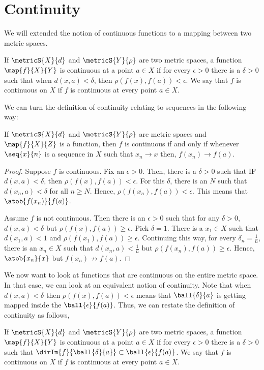 \section{Continuity}
We will extended the notion of continuous functions to a mapping between two metric spaces.
\begin{Definition}[name=Continuous function]
    If $\metricS{X}{d}$ and $\metricS{Y}{\rho}$ are two metric spaces, a function $\map{f}{X}{Y}$ is
    continuous at a point $a \in X$ if for every $\epsilon > 0$ there is a $\delta > 0$ such that when 
    $d(x,a) < \delta$, then $\rho(f(x),f(a)) < \epsilon$. We say that $f$ is continuous on $X$ if $f$ is
    continuous at every point $a \in X$.
\end{Definition}
We can turn the definition of continuity relating to sequences in the following way:
\begin{Proposition}
    If $\metricS{X}{d}$ and $\metricS{Y}{\rho}$ are metric spaces and $\map{f}{X}{Z}$ is a function, then
    $f$ is continuous if and only if whenever $\seq{x}{n}$ is a sequence in $X$ such that $x_n\to x$ then,
    $f(x_n)\to f(a)$.
\end{Proposition}
\begin{proof}
    Suppose $f$ is continuous. Fix an $\epsilon > 0$. Then, there is a $\delta > 0$ such that IF $d(x,a) <
    \delta$, then $\rho(f(x),f(a)) < \epsilon$. For this $\delta$, there is an $N$ such that $d(x_n,a) <
    \delta$ for all $n \geq N$. Hence, $\rho(f(x_n),f(a)) < \epsilon$. This means that $\atob{f(x_n)}{f(a)}$.

    Assume $f$ is not continuous. Then there is an $\epsilon > 0$ such that for any $\delta > 0$,
    $d(x,a) < \delta$ but $\rho(f(x),f(a)) \geq \epsilon$.
    Pick $\delta = 1$. There is a $x_1 \in X$ such that $d(x_1,a) < 1$ and $\rho(f(x_1),f(a)) \geq \epsilon$.
    Continuing this way, for every $\delta_n = \frac{1}{n}$, there is an $x_n \in X$ such that $d(x_n,a) <
    \frac{1}{n}$ but $\rho(f(x_n),f(a)) \geq \epsilon$. Hence, $\atob{x_n}{x}$ but $f(x_n)\not\to f(a)$.
\end{proof}
We now want to look at functions that are continuous on the entire metric space. In that case, we can look at
an equivalent notion of continuity. Note that when $d(x,a) < \delta$ then $\rho(f(x),f(a)) < \epsilon$ 
means that $\ball{\delta}{a}$ is getting mapped inside the $\ball{\epsilon}{f(a)}$. Thus, we can restate the
definition of continuity as follows,
\begin{Proposition}
     If $\metricS{X}{d}$ and $\metricS{Y}{\rho}$ are two metric spaces, a function $\map{f}{X}{Y}$ is 
     continuous at a point $a \in X$ if for every $\epsilon > 0$ there is a $\delta > 0$ such that 
     $\dirIm{f}{\ball{\delta}{a}} \subset \ball{\epsilon}{f(a)}$. We say that $f$ is continuous on $X$ if $f$ is
    continuous at every point $a \in X$.
\end{Proposition}
